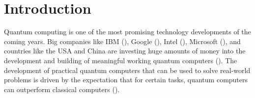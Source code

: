 \documentclass[a4paper,12pt]{article}
\begin{document}
%		
%		
%		
%		
%		
%		
%		

\newpage

\tableofcontents

\newpage

\section{Introduction}
Quantum computing is one of the most promising technology developments of the coming years.
Big companies like IBM (\cite{ibm-quantum}), Google (\cite{google-quantum}), Intel (\cite{intel-quantum}), Microsoft (\cite{microsoft-quantum}), and countries like the USA and China are investing huge amounts of money into the development and building of meaningful working quantum computers (\cite{usa-quantum, china-quantum}).
The development of practical quantum computers that can be used to solve real-world problems is driven by the expectation that for certain tasks, quantum computers can outperform classical computers (\cite{preskill-qc}).
\end{document}
